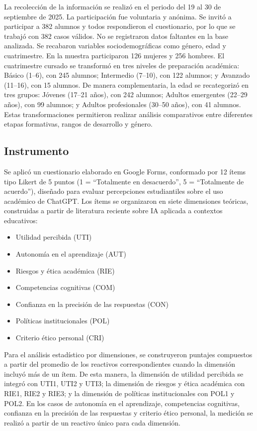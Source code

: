 \documentclass[spanish]{textolivre}
\begin{document}
La recolección de la información se realizó en el periodo del 19 al 30 de septiembre de 2025. La participación fue voluntaria y anónima. Se invitó a participar a 382 alumnos y todos respondieron el cuestionario, por lo que se trabajó con 382 casos válidos. No se registraron datos faltantes en la base analizada. Se recabaron variables sociodemográficas como género, edad y cuatrimestre. En la muestra participaron 126 mujeres y 256 hombres. El cuatrimestre cursado se transformó en tres niveles de preparación académica: Básico (1–6), con 245 alumnos; Intermedio (7–10), con 122 alumnos; y Avanzado (11–16), con 15 alumnos. De manera complementaria, la edad se recategorizó en tres grupos: Jóvenes (17–21 años), con 242 alumnos; Adultos emergentes (22–29 años), con 99 alumnos; y Adultos profesionales (30–50 años), con 41 alumnos. Estas transformaciones permitieron realizar análisis comparativos entre diferentes etapas formativas, rangos de desarrollo y género.

\subsection{Instrumento}

Se aplicó un cuestionario elaborado en Google Forms, conformado por 12 ítems tipo Likert de 5 puntos (1 = “Totalmente en desacuerdo”, 5 = “Totalmente de acuerdo”), diseñado para evaluar percepciones estudiantiles sobre el uso académico de ChatGPT. Los ítems se organizaron en siete dimensiones teóricas, construidas a partir de literatura reciente sobre IA aplicada a contextos educativos:

\begin{itemize}
    \item Utilidad percibida (UTI)
    \item Autonomía en el aprendizaje (AUT)
    \item Riesgos y ética académica (RIE)
    \item Competencias cognitivas (COM)
    \item Confianza en la precisión de las respuestas (CON)
    \item Políticas institucionales (POL)
    \item Criterio ético personal (CRI)
\end{itemize}
    

Para el análisis estadístico por dimensiones, se construyeron puntajes compuestos a partir del promedio de los reactivos correspondientes cuando la dimensión incluyó más de un ítem. De esta manera, la dimensión de utilidad percibida se integró con UTI1, UTI2 y UTI3; la dimensión de riesgos y ética académica con RIE1, RIE2 y RIE3; y la dimensión de políticas institucionales con POL1 y POL2. En los casos de autonomía en el aprendizaje, competencias cognitivas, confianza en la precisión de las respuestas y criterio ético personal, la medición se realizó a partir de un reactivo único para cada dimensión.
\end{document}
